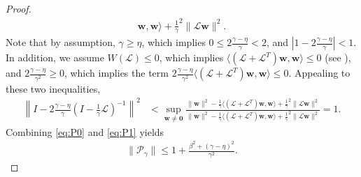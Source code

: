 \documentclass[a4paper,10pt]{article}
\begin{document}
\begin{proof}
\begin{align*}
{		\mathbf{w},\mathbf{w}\rangle + \tfrac{1}{\gamma}^2\|\mathcal{L}\mathbf{w}\|^2}.
\end{align*}
%
Note that by assumption, $\gamma \geq \eta$, which implies
$0 \leq 2\tfrac{\gamma-\eta}{\gamma}  < 2$, and 
$|1 - 2\tfrac{\gamma-\eta}{\gamma}| < 1$. In addition, we assume $W(\mathcal{L})\leq 0$,
which implies $\langle (\mathcal{L}+\mathcal{L}^T)\mathbf{w},\mathbf{w}\rangle \leq 0$
(see ), and
$2\tfrac{\gamma-\eta}{\gamma^2} \geq 0$, which implies the term
$2\tfrac{\gamma-\eta}{\gamma^2}\langle (\mathcal{L}+\mathcal{L}^T)
	\mathbf{w},\mathbf{w}\rangle\leq 0$. Appealing to these two inequalities,
%
\begin{align} \label{eq:P1}
\left\| I - 2\tfrac{\gamma-\eta}
	{\gamma}(I - \tfrac{1}{\gamma}\mathcal{L})^{-1}\right\|^2
& < \sup_{\mathbf{w}\neq\mathbf{0}} \frac{\|\mathbf{w}\|^2
	- \tfrac{1}{\gamma}\langle (\mathcal{L} + \mathcal{L}^T)
		\mathbf{w},\mathbf{w}\rangle + \tfrac{1}{\gamma}^2\|\mathcal{L}\mathbf{w}\|^2}
	{\|\mathbf{w}\|^2 - \tfrac{1}{\gamma}\langle (\mathcal{L} + \mathcal{L}^T)
		\mathbf{w},\mathbf{w}\rangle + \tfrac{1}{\gamma}^2\|\mathcal{L}\mathbf{w}\|^2} 
= 1.
\end{align}
%
Combining \eqref{eq:P0} and \eqref{eq:P1} yields
%
\begin{align}\label{eq:Pgamma}
\|\mathcal{P}_\gamma\| \leq 1 + \frac{\beta^2 + (\gamma-\eta)^2}{\gamma^2}.
\end{align}


\end{proof}
\end{document}
